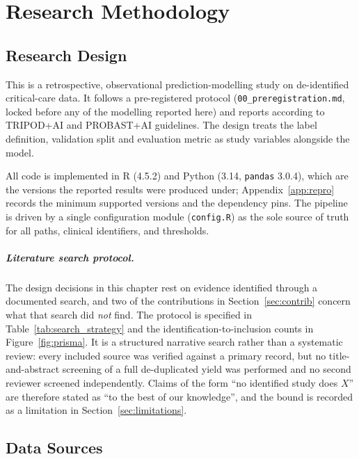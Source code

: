 \chapter{Research Methodology}
\label{ch:methodology}


\section{Research Design}

This is a retrospective, observational prediction-modelling study on
de-identified critical-care data. It follows a pre-registered protocol
(\texttt{00\_preregistration.md}, locked before any of the modelling reported
here) and reports
according to TRIPOD+AI \cite{collins2024tripodai} and PROBAST+AI
\cite{moons2025probastai} guidelines. The design treats the label definition,
validation split and evaluation metric as study variables alongside the model.

All code is implemented in R (4.5.2) and Python (3.14, \texttt{pandas} 3.0.4),
which are the versions the reported results were produced under; Appendix~\ref{app:repro} records the
minimum supported versions and the dependency pins. The pipeline is driven by a single
configuration module (\texttt{config.R}) as the sole source of truth for all
paths, clinical identifiers, and thresholds.

\paragraph{Literature search protocol.} The design decisions in this chapter
rest on evidence identified through a documented search, and two of the
contributions in Section~\ref{sec:contrib} concern what that search did
\emph{not} find. The protocol is specified in Table~\ref{tab:search_strategy}
and the identification-to-inclusion counts in Figure~\ref{fig:prisma}. It is a
structured narrative search rather than a systematic review: every included
source was verified against a primary record, but no title-and-abstract
screening of a full de-duplicated yield was performed and no second reviewer
screened independently. Claims of the form ``no identified study does $X$'' are
therefore stated as ``to the best of our knowledge'', and the bound is recorded
as a limitation in Section~\ref{sec:limitations}.


\section{Data Sources}
\label{sec:data}

